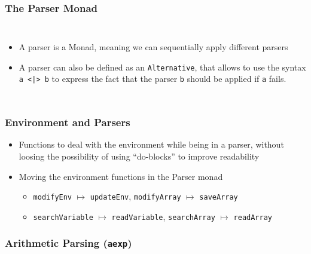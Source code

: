 \documentclass{beamer}
\begin{document}
\begin{frame}
	\frametitle{The Parser Monad}
	\begin{columns}
		\footnotesize
		\begin{itemize}
			\item A parser is a Monad, meaning we can sequentially apply
				different parsers
			\item A parser can also be defined as an \texttt{Alternative}, that
				allows to use the syntax \lstinline!a <|> b! to express the
				fact that the parser \texttt{b} should be applied if \texttt{a}
				fails.
		\end{itemize}
		
		
	\end{columns}
\end{frame}

\begin{frame}
	\frametitle{Environment and Parsers}
	\begin{itemize}
		\footnotesize
		\item Functions to deal with the environment while being in a parser,
			without loosing the possibility of using ``do-blocks'' to improve
			readability
		\item Moving the environment functions in the Parser monad
			\begin{itemize}
				\item \lstinline{modifyEnv} $\mapsto$ \lstinline{updateEnv},
					\lstinline{modifyArray} $\mapsto$ \lstinline{saveArray}
				\item \lstinline{searchVariable} $\mapsto$ \lstinline{readVariable},
					\lstinline{searchArray} $\mapsto$ \lstinline{readArray}
			\end{itemize}
	\end{itemize}
	
	
	
	
\end{frame}

\begin{frame}
	\frametitle{Arithmetic Parsing (\texttt{aexp})}
	\begin{columns}
		\column{0.4\textwidth}
		
		
		\column{0.6\textwidth}
		
	\end{columns}
\end{frame}
\end{document}
